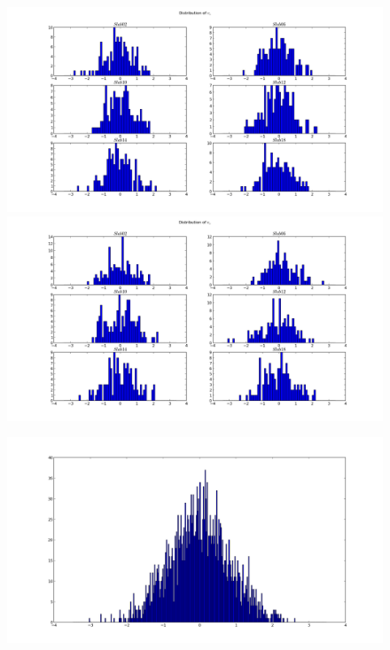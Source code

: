 \documentclass[12pt,a4paper]{article}
\begin{document}
\section{}
\begin{figure}[!htb]
  \includegraphics[width=\linewidth]{fVx.png}
\endminipage\hfill
{}
  \includegraphics[width=\linewidth]{fVz.png}
\endminipage\hfill
\end{figure}

\begin{figure}[h]
\centering
  \includegraphics[width=0.6\linewidth]{fsystem.png}
\end{figure}
\end{document}
